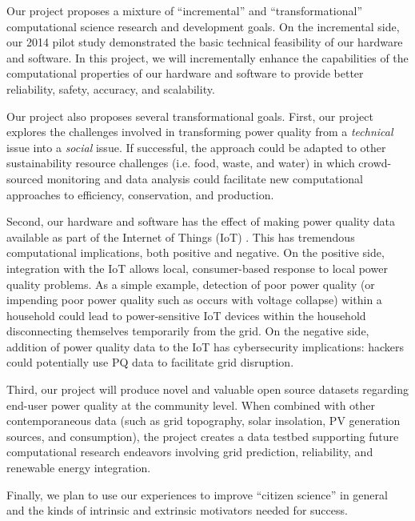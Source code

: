 Our project proposes a mixture of ``incremental'' and ``transformational'' computational science research and development goals. On the incremental side, our 2014 pilot study \cite{g1-pilot-study} demonstrated the basic technical feasibility of our hardware and software. In this project, we will incrementally enhance the capabilities of the computational properties of our hardware and software to provide better reliability, safety, accuracy, and scalability.   

Our project also proposes several transformational goals.  First, our project explores the challenges involved in transforming power quality from a {\em technical} issue into a {\em social} issue. If successful, the approach could be adapted to other sustainability resource challenges (i.e. food, waste, and water) in which crowd-sourced monitoring and data analysis could facilitate new computational approaches to efficiency, conservation, and production.

Second, our hardware and software has the effect of making power quality data available as part of the Internet of Things (IoT) \cite{iot}. This has tremendous computational implications, both positive and negative.  On the positive side, integration with the IoT allows local, consumer-based response to local power quality problems. As a simple example, detection of poor power quality (or impending poor power quality such as occurs with voltage collapse) within a household could lead to power-sensitive IoT devices within the household disconnecting themselves temporarily from the grid. On the negative side, addition of power quality data to the IoT has cybersecurity implications: hackers could potentially use PQ data to facilitate grid disruption.  

Third, our project will produce novel and valuable open source datasets regarding end-user power quality at the community level. When combined with other contemporaneous data (such as grid topography, solar insolation, PV generation sources, and consumption), the project creates a data testbed supporting future computational research endeavors involving grid prediction, reliability, and renewable energy integration. 

Finally, we plan to use our experiences to improve ``citizen science'' in general and the kinds of intrinsic and extrinsic motivators needed for success. 

